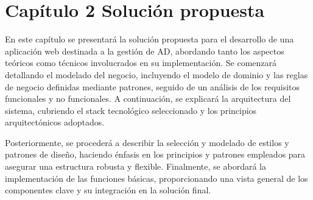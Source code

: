 \section{Capítulo 2 Solución propuesta}

En este capítulo se presentará la solución propuesta para el desarrollo de una aplicación web destinada a la gestión de AD, abordando tanto los aspectos teóricos como técnicos involucrados en su implementación. Se comenzará detallando el modelado del negocio, incluyendo el modelo de dominio y las reglas de negocio definidas mediante patrones, seguido de un análisis de los requisitos funcionales y no funcionales. A continuación, se explicará la arquitectura del sistema, cubriendo el stack tecnológico seleccionado y los principios arquitectónicos adoptados.

Posteriormente, se procederá a describir la selección y modelado de estilos y patrones de diseño, haciendo énfasis en los principios y patrones empleados para asegurar una estructura robusta y flexible. Finalmente, se abordará la implementación de las funciones básicas, proporcionando una vista general de los componentes clave y su integración en la solución final.







